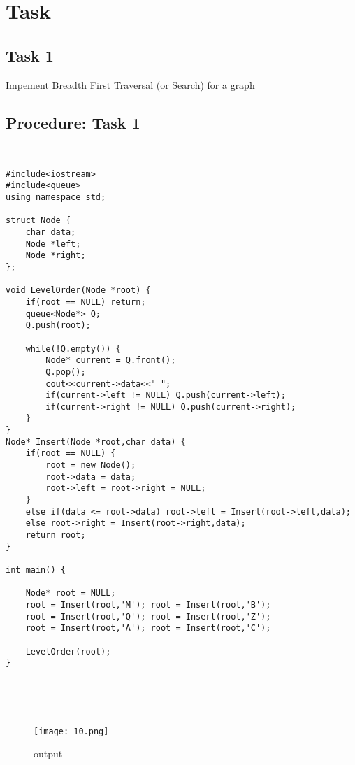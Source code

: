 \documentclass[11pt]{article}            %
\begin{document}
\section{Task}  

\subsection{ Task 1 }     

Impement Breadth First Traversal (or Search) for a graph

\subsection{Procedure: Task 1 }    
 

\begin{lstlisting}


#include<iostream>
#include<queue>
using namespace std;

struct Node {
	char data;
	Node *left;
	Node *right;
};

void LevelOrder(Node *root) {
	if(root == NULL) return;
	queue<Node*> Q;
	Q.push(root);  

	while(!Q.empty()) {
		Node* current = Q.front();
		Q.pop(); 
		cout<<current->data<<" ";
		if(current->left != NULL) Q.push(current->left);
		if(current->right != NULL) Q.push(current->right);
	}
}
Node* Insert(Node *root,char data) {
	if(root == NULL) {
		root = new Node();
		root->data = data;
		root->left = root->right = NULL;
	}
	else if(data <= root->data) root->left = Insert(root->left,data);
	else root->right = Insert(root->right,data);
	return root;
}

int main() {

	Node* root = NULL;
	root = Insert(root,'M'); root = Insert(root,'B');
	root = Insert(root,'Q'); root = Insert(root,'Z'); 
	root = Insert(root,'A'); root = Insert(root,'C');

	LevelOrder(root);
}





\end{lstlisting}
\begin{figure*}
\centering
  \texttt{[image: 10.png]}
\caption{output}
\label{Figure:3}    
\end{figure*} 




 
\end{document}
